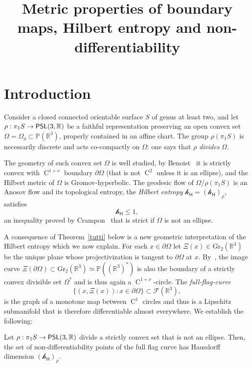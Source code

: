 \documentclass[AHL,Unicode,longabstracts,MathTools]{cedram}
\title[Metric properties of boundary maps]{Metric properties of boundary maps, Hilbert entropy and non-differentiability}
\author[\initial{M. B.} \lastname{Pozzetti}]{\firstname{Maria Beatrice} \lastname{Pozzetti}}
\author[\initial{A.} \lastname{Sambarino}]{\firstname{Andrés} \lastname{Sambarino}}
\DeclareMathOperator{\class}{C}
\newcommand{\grass}{\mathrm{Gr}}
\DeclareMathOperator{\PSL}{{\mathsf{PSL}}}
\newcommand{\scr}{\mathscr}
\newcommand{\hJ}[1]{{\scr h}_{#1}}
\renewcommand{\sf}[1]{{\mathsf{#1}}}
\newcommand{\calF}{\mathcal{F}}
\newcommand{\R}{\mathbb{R}}
\renewcommand{\P}{\mathbb{P}}
\newcommand{\bord}{\partial}
\newcommand{\piS}{\pi_1S}
\renewcommand{\/}{\backslash}
\newcommand{\<}{\langle}
\renewcommand{\>}{\rangle}
\renewcommand*{\to}{\mathchoice{\longrightarrow}{\rightarrow}{\rightarrow}{\rightarrow}}
\begin{document}
\maketitle
\tableofcontents

\section{Introduction}\label{intro}

Consider a closed connected orientable surface $S$ of genus at least two, and let $\rho:\piS\to\PSL(3,\R)$ be a faithful representation preserving an open convex set $\Omega=\Omega_\rho\subset\P(\R^3)$, properly contained in an affine chart. The group $\rho(\piS)$ is necessarily discrete and acts co-compactly on $\Omega$: one says that $\rho$ \emph{divides} $\Omega$.



The geometry of such convex set $\Omega$ is well studied, by Benoist~\cite{convexes1} it is strictly convex with $\class^{1+\nu}$ boundary $\bord\Omega$ (that is not $\class^2$ unless it is an ellipse), and the Hilbert metric of $\Omega$ is Gromov-hyperbolic. The geodesic flow of $\Omega/\rho(\piS)$ is an Anosov flow and its topological entropy, the \emph{Hilbert entropy} $\hJ{\sf H}={(\hJ{\sf H})}_\rho$, satisfies
\[
\hJ{\sf H}\leq1,
\]
an inequality proved by Crampon~\cite{crampon} that is strict if $\Omega$ is not an ellipse.



A consequence of Theorem~\ref{tutti} below is a new geometric interpretation of the Hilbert entropy which we now explain. For each $x\in\bord\Omega$ let $\Xi(x)\in\grass_{2}(\R^3)$ be the unique plane whose projectivization is tangent to $\bord\Omega$ at $x$. By~\cite{convexes1}, the image curve $\Xi(\bord\Omega)\subset\grass_2(\R^3)\simeq\P((\R^3)^*)$ is also the boundary of a strictly convex divisible set $\Omega^*$ and is thus again a $\class^{1+\nu}$-circle.
The \emph{full-flag-curve}
\[
\{(x,\Xi(x)):x\in\bord\Omega\}\subset\calF(\R^3),
\]
is the graph of a monotone map between $\class^1$ circles and thus is a Lipschitz submanifold that is therefore differentiable almost everywhere. We establish the following:



\begin{coro}\label{hilbert}
Let $\rho:\piS\to\PSL(3,\R)$ divide a strictly convex set that is not an ellipse. Then, the set of non-differentiability points of the full flag curve
has Hausdorff dimension ${(\hJ{\sf H})}_\rho$.
\end{coro}
\end{document}
